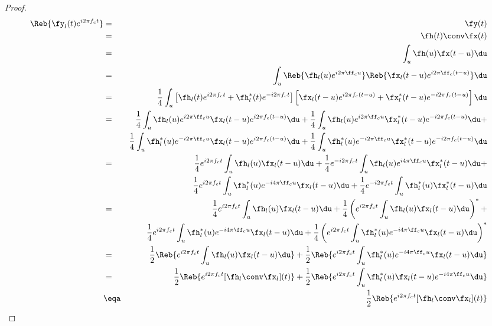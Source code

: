 \begin{proof}
\begin{eqnarray*}
   \Reb{ \fy_l(t)e^{i2\pi f_ct}}
     &=& \fy(t)
   \\&=& \fh(t) \conv \fx(t)
   \\&=& \int_u \fh(u)\fx(t-u)\du
   \\&=& \int_u \Reb{ \fh_l(u)e^{i2\pi \ff_cu}}
                \Reb{ \fx_l(t-u)e^{i2\pi \ff_c(t-u)}} \du
   \\&=& \frac{1}{4}
         \int_u \left[\fh_l(t)  e^{i2\pi f_ct    } + \fh_l^\ast(t  )e^{-i2\pi f_c t }\right]
                \left[\fx_l(t-u)e^{i2\pi f_c(t-u)} + \fx_l^\ast(t-u)e^{-i2\pi f_c(t-u)}\right] \du
   \\&=& \frac{1}{4}\int_u \fh_l(u)     e^{ i2\pi \ff_cu} \fx_l(t-u)     e^{ i2\pi f_c(t-u)} \du
       + \frac{1}{4}\int_u \fh_l(u)     e^{ i2\pi \ff_cu} \fx_l^\ast(t-u)e^{-i2\pi f_c(t-u)} \du +
   \\&&  \frac{1}{4}\int_u \fh_l^\ast(u)e^{-i2\pi \ff_cu} \fx_l(t-u)     e^{ i2\pi f_c(t-u)} \du
       + \frac{1}{4}\int_u \fh_l^\ast(u)e^{-i2\pi \ff_cu} \fx_l^\ast(t-u)e^{-i2\pi f_c(t-u)} \du
%
   \\&=& \frac{1}{4}e^{ i2\pi f_ct} \int_u \fh_l(u)\fx_l(t-u)                         \du
       + \frac{1}{4}e^{-i2\pi f_ct} \int_u \fh_l(u) e^{ i4\pi \ff_cu} \fx_l^\ast(t-u) \du +
   \\&&  \frac{1}{4}e^{ i2\pi f_ct} \int_u \fh_l^\ast(u)e^{-i4\pi \ff_cu} \fx_l(t-u)  \du
       + \frac{1}{4}e^{-i2\pi f_ct} \int_u \fh_l^\ast(u) \fx_l^\ast(t-u)              \du
%
   \\&=& \frac{1}{4}      e^{ i2\pi f_ct} \int_u \fh_l(u)\fx_l(t-u)                         \du
        +\frac{1}{4}\left(e^{ i2\pi f_ct} \int_u \fh_l(u)\fx_l(t-u)                         \du \right)^\ast +
   \\&&  \frac{1}{4}      e^{ i2\pi f_ct} \int_u \fh_l^\ast(u) e^{-i4\pi \ff_cu} \fx_l(t-u) \du
       + \frac{1}{4}\left(e^{ i2\pi f_ct} \int_u \fh_l^\ast(u) e^{-i4\pi \ff_cu} \fx_l(t-u) \du \right)^\ast
%
   \\&=& \frac{1}{2}\Reb{ e^{ i2\pi f_ct} \int_u \fh_l(u)\fx_l(t-u)                         \du }
        +\frac{1}{2}\Reb{ e^{ i2\pi f_ct} \int_u \fh_l^\ast(u) e^{-i4\pi \ff_cu} \fx_l(t-u) \du }
   \\&=& \frac{1}{2}\Reb{ e^{ i2\pi f_ct} [\fh_l\conv\fx_l](t) }
        +\frac{1}{2}\Reb{ e^{ i2\pi f_ct} \int_u \fh_l^\ast(u) \fx_l(t-u) e^{-i4\pi \ff_cu} \du }
   \\&\eqa& \frac{1}{2}\Reb{ e^{ i2\pi f_ct} [\fh_l\conv\fx_l](t) }

\end{eqnarray*}
\end{proof}

